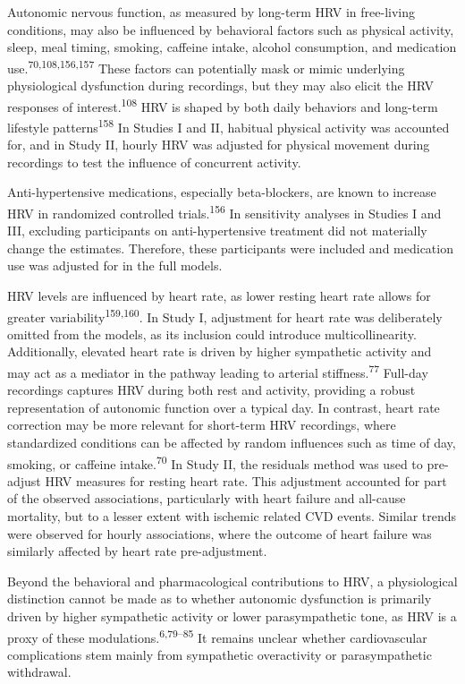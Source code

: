\documentclass[
  a4paper,
  headsepline=true,
  open=left]{scrbook}
\begin{document}
Autonomic nervous function, as measured by long-term HRV in free-living
conditions, may also be influenced by behavioral factors such as
physical activity, sleep, meal timing, smoking, caffeine intake, alcohol
consumption, and medication use.\textsuperscript{70,108,156,157} These
factors can potentially mask or mimic underlying physiological
dysfunction during recordings, but they may also elicit the HRV
responses of interest.\textsuperscript{108} HRV is shaped by both daily
behaviors and long-term lifestyle patterns\textsuperscript{158} In
Studies I and II, habitual physical activity was accounted for, and in
Study II, hourly HRV was adjusted for physical movement during
recordings to test the influence of concurrent activity.

Anti-hypertensive medications, especially beta-blockers, are known to
increase HRV in randomized controlled trials.\textsuperscript{156} In
sensitivity analyses in Studies I and III, excluding participants on
anti-hypertensive treatment did not materially change the estimates.
Therefore, these participants were included and medication use was
adjusted for in the full models.

HRV levels are influenced by heart rate, as lower resting heart rate
allows for greater variability\textsuperscript{159,160}. In Study I,
adjustment for heart rate was deliberately omitted from the models, as
its inclusion could introduce multicollinearity. Additionally, elevated
heart rate is driven by higher sympathetic activity and may act as a
mediator in the pathway leading to arterial
stiffness.\textsuperscript{77} Full-day recordings captures HRV during
both rest and activity, providing a robust representation of autonomic
function over a typical day. In contrast, heart rate correction may be
more relevant for short-term HRV recordings, where standardized
conditions can be affected by random influences such as time of day,
smoking, or caffeine intake.\textsuperscript{70} In Study II, the
residuals method was used to pre-adjust HRV measures for resting heart
rate. This adjustment accounted for part of the observed associations,
particularly with heart failure and all-cause mortality, but to a lesser
extent with ischemic related CVD events. Similar trends were observed
for hourly associations, where the outcome of heart failure was
similarly affected by heart rate pre-adjustment.

Beyond the behavioral and pharmacological contributions to HRV, a
physiological distinction cannot be made as to whether autonomic
dysfunction is primarily driven by higher sympathetic activity or lower
parasympathetic tone, as HRV is a proxy of these
modulations.\textsuperscript{6,79--85} It remains unclear whether
cardiovascular complications stem mainly from sympathetic overactivity
or parasympathetic withdrawal.
\end{document}
